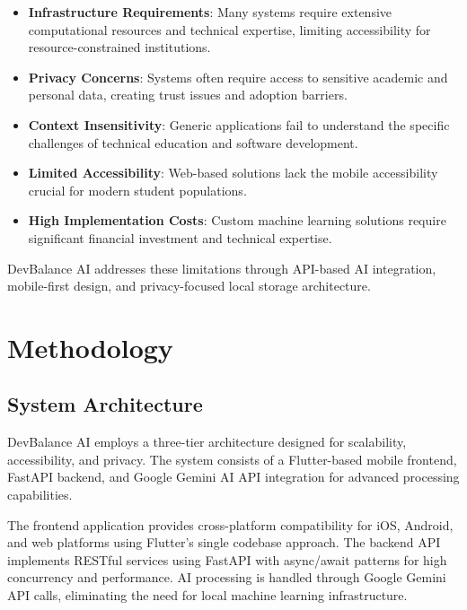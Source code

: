 \documentclass[conference,10pt]{IEEEtran}
\begin{document}
\begin{itemize}
\item \textbf{Infrastructure Requirements}: Many systems require extensive computational resources and technical expertise, limiting accessibility for resource-constrained institutions.

\item \textbf{Privacy Concerns}: Systems often require access to sensitive academic and personal data, creating trust issues and adoption barriers.

\item \textbf{Context Insensitivity}: Generic applications fail to understand the specific challenges of technical education and software development.

\item \textbf{Limited Accessibility}: Web-based solutions lack the mobile accessibility crucial for modern student populations.

\item \textbf{High Implementation Costs}: Custom machine learning solutions require significant financial investment and technical expertise.
\end{itemize}

DevBalance AI addresses these limitations through API-based AI integration, mobile-first design, and privacy-focused local storage architecture.

\section{Methodology}

\subsection{System Architecture}

DevBalance AI employs a three-tier architecture designed for scalability, accessibility, and privacy. The system consists of a Flutter-based mobile frontend, FastAPI backend, and Google Gemini AI API integration for advanced processing capabilities.

The frontend application provides cross-platform compatibility for iOS, Android, and web platforms using Flutter's single codebase approach. The backend API implements RESTful services using FastAPI with async/await patterns for high concurrency and performance. AI processing is handled through Google Gemini API calls, eliminating the need for local machine learning infrastructure.
\end{document}

